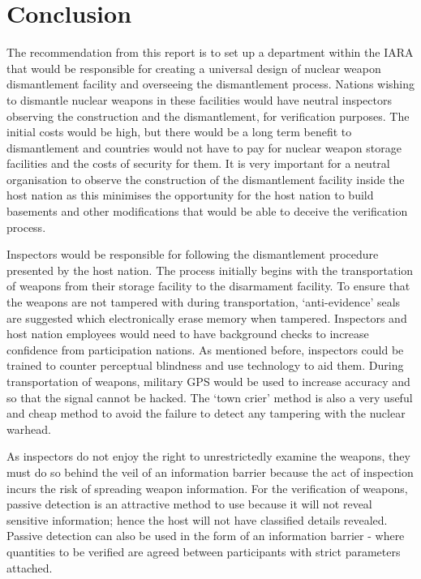 \documentclass[twoside,titlepage,11pt,twocolumn,a4paper]{article}
\begin{document}
\section{Conclusion}
The recommendation from this report is to set up a department within 
the IARA that would be responsible for creating a universal design 
of nuclear weapon dismantlement facility and overseeing the 
dismantlement process. Nations wishing to dismantle nuclear 
weapons in these facilities would have neutral inspectors observing
the construction and the dismantlement, for verification purposes. 
The initial costs would be high, but there would be a long term 
benefit to dismantlement and countries would not have to pay for 
nuclear weapon storage facilities and the costs of security for 
them. It is very important for a neutral organisation to observe 
the construction of the dismantlement facility inside the host 
nation as this minimises the opportunity for the host nation to 
build basements and other modifications that would be able to 
deceive the verification process.

Inspectors would be responsible for following the dismantlement
procedure presented by the host nation. The process initially 
begins with the transportation of weapons from their storage 
facility to the disarmament facility. To ensure that the weapons 
are not tampered with during transportation, `anti-evidence' 
seals are suggested which electronically erase memory when 
tampered. Inspectors and host nation employees would need to 
have background checks to increase confidence from participation 
nations. As mentioned before, inspectors could be trained to 
counter perceptual blindness and use technology to aid them. 
During transportation of weapons, military GPS would be used 
to increase accuracy and so that the signal cannot be hacked. 
The ‘town crier’ method is also a very useful and cheap method 
to avoid the failure to detect any tampering with the nuclear warhead.

As inspectors do not enjoy the right to unrestrictedly examine 
the weapons, they must do so behind the veil of an information 
barrier because the act of inspection incurs the risk of spreading 
weapon information. For the verification of weapons, passive 
detection is an attractive method to use because it will not 
reveal sensitive information; hence the host will not have 
classified details revealed. Passive detection can also be 
used in the form of an information barrier - where quantities 
to be verified are agreed between participants with strict 
parameters attached. 
\end{document}
